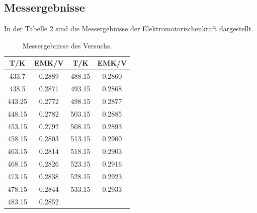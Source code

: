 \documentclass[12pt,a4paper,titlepage,headinclude,bibtotoc]{scrartcl}
\begin{document}
\subsection{Messergebnisse}
In der Tabelle 2 sind die Messergebnisse der Elektromotorischenkraft dargestellt.
\begin{table}[h!]
\centering
\caption{Messergebnisse des Versuchs.}
\begin{tabular}{c|c||c|c}
T/\;K & EMK/\;V &T/\;K & EMK/\;V\\ 
\hline
433.7 & 0.2889 &   488.15 &0.2860\\ 
438.5 & 0.2871 & 493.15&0.2868 \\
443.25 & 0.2772 &  498.15&0.2877\\
448.15 & 0.2782 & 503.15& 0.2885\\
453.15 &0.2792 & 508.15 &0.2893\\
458.15 & 0.2803 & 513.15 &0.2900\\
463.15 &0.2814 & 518.15 &0.2903\\
468.15 &0.2826 & 523.15&0.2916\\
473.15 &0.2838 & 528.15 & 0.2923\\
478.15 & 0.2844 & 533.15& 0.2933\\
483.15 & 0.2852 &&\\
\end{tabular} 
\end{table}
\FloatBarrier
\end{document}
